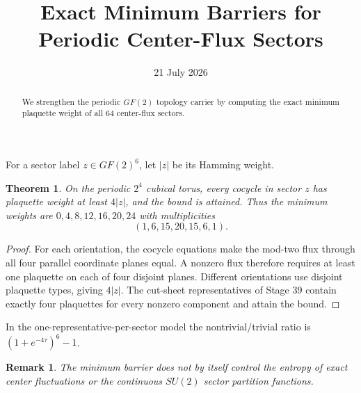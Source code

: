 \documentclass[11pt]{article}\usepackage[margin=1in]{geometry}\usepackage{amsmath,amsthm}\newtheorem{theorem}{Theorem}\newtheorem{remark}{Remark}
\title{Exact Minimum Barriers for Periodic Center-Flux Sectors}\author{}\date{21 July 2026}
\begin{document}
\maketitle
\begin{abstract}We strengthen the periodic $GF(2)$ topology carrier by computing the exact minimum plaquette weight of all 64 center-flux sectors.\end{abstract}
For a sector label $z\in GF(2)^6$, let $|z|$ be its Hamming weight.
\begin{theorem}On the periodic $2^4$ cubical torus, every cocycle in sector $z$ has plaquette weight at least $4|z|$, and the bound is attained. Thus the minimum weights are $0,4,8,12,16,20,24$ with multiplicities
\[(1,6,15,20,15,6,1).\]
\end{theorem}
\begin{proof}For each orientation, the cocycle equations make the mod-two flux through all four parallel coordinate planes equal. A nonzero flux therefore requires at least one plaquette on each of four disjoint planes. Different orientations use disjoint plaquette types, giving $4|z|$. The cut-sheet representatives of Stage 39 contain exactly four plaquettes for every nonzero component and attain the bound.\end{proof}
In the one-representative-per-sector model the nontrivial/trivial ratio is $(1+e^{-4\tau})^6-1$.
\begin{remark}The minimum barrier does not by itself control the entropy of exact center fluctuations or the continuous $SU(2)$ sector partition functions.\end{remark}
\end{document}
